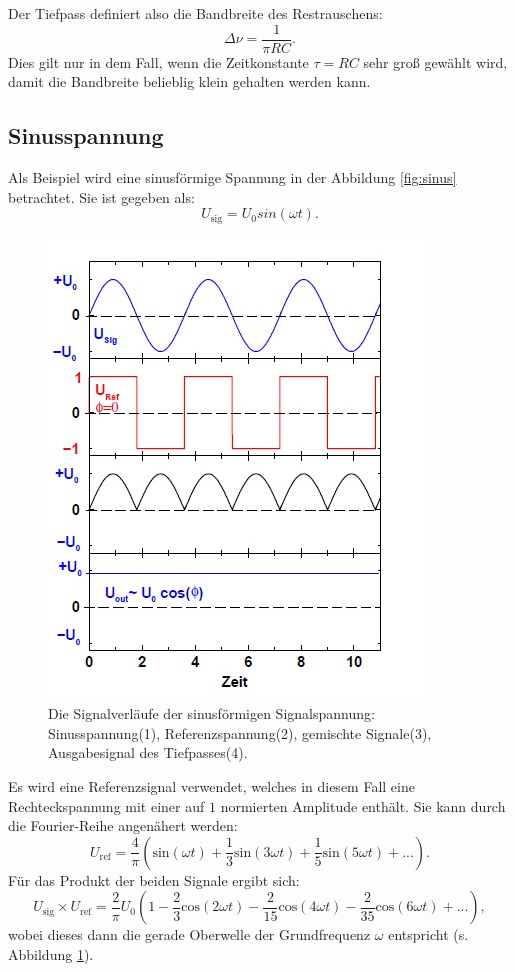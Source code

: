 Der Tiefpass definiert also die Bandbreite des Restrauschens:
\begin{equation*}
\Delta \nu = \frac{1}{\pi RC}.
\end{equation*}
Dies gilt nur in dem Fall, wenn die Zeitkonstante $\tau = RC$ sehr groß gewählt wird, damit die Bandbreite belieblig klein gehalten werden kann. 

\subsection{Sinusspannung}
Als Beispiel wird eine sinusförmige Spannung in der Abbildung \eqref{fig:sinus} betrachtet. Sie ist gegeben als: 
\begin{equation*}
U_{\text{sig}} = U_{0}sin(\omega t).
\end{equation*}

\begin{figure}[h!]
	\centering
	\includegraphics[width=0.7\linewidth]{sinus.jpg}
	\caption{Die Signalverläufe der sinusförmigen Signalspannung: Sinusspannung(1), Referenzspannung(2), gemischte Signale(3), Ausgabesignal des Tiefpasses(4). \cite[2]{anleitung303}}
	\label{fig:sinus}
\end{figure}

Es wird eine Referenzsignal verwendet, welches in diesem Fall eine Rechteckspannung mit einer auf $1$ normierten Amplitude enthält. Sie kann durch die Fourier-Reihe angenähert werden:
\begin{equation*}
U_{\text{ref}} = \frac{4}{\pi} \left(\text{sin}(\omega t) + \frac{1}{3}\text{sin}(3\omega t) + \frac{1}{5}\text{sin}(5\omega t) + ... \right).
\end{equation*}
Für das Produkt der beiden Signale ergibt sich:
\begin{equation*}
U_{\text{sig}} \times U_{\text{ref}} = \frac{2}{\pi}U_{0} \left(1 - \frac{2}{3}\text{cos}(2 \omega t) - \frac{2}{15}\text{cos}(4 \omega t) - \frac{2}{35}\text{cos}(6 \omega t) + ... \right),
\end{equation*}
wobei dieses dann die gerade Oberwelle der Grundfrequenz $\omega$ entspricht (s. Abbildung \ref{fig:sinus}).

